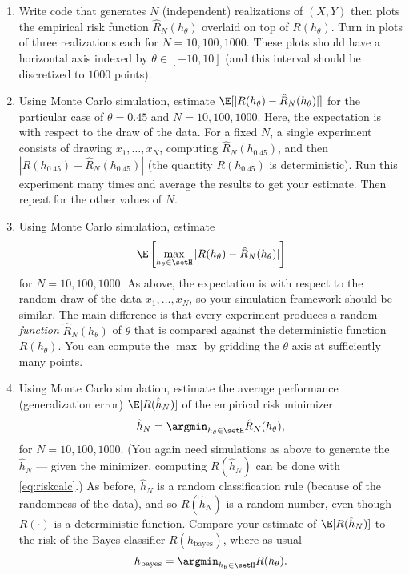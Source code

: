 \documentclass[11pt]{article}
\begin{document}
\begin{enumerate}
\begin{enumerate}
	
	\item   Write code that generates $N$ (independent) realizations of $(X,Y)$ then plots the empirical risk function $\hat{R}_N(h_\theta)$ overlaid on top of $R(h_\theta)$.  Turn in plots of three realizations each for $N=10,100,1000$.  These plots should have a horizontal axis indexed by $\theta\in[-10,10]$ (and this interval should be discretized to $1000$ points).
	
	\item Using Monte Carlo simulation, estimate $\E[|R(h_\theta)-\hat{R}_N(h_\theta)|]$ for the particular case of $\theta = 0.45$ and $N=10,100,1000$.  Here, the expectation is with respect to the draw of the data.  For a fixed $N$, a single experiment consists of drawing $x_1,\ldots,x_N$, computing $\hat{R}_N(h_{0.45})$, and then $|R(h_{0.45})-\hat{R}_N(h_{0.45})|$ (the quantity $R(h_{0.45})$ is deterministic).  Run this experiment many times and average the results to get your estimate.  Then repeat for the other values of $N$.
	
	\item Using Monte Carlo simulation, estimate 
	\[
		\E\left[\max_{h_\theta\in\setH}|R(h_\theta)-\hat{R}_N(h_\theta)|\right]
	\]
	for $N=10,100,1000$.  As above, the expectation is with respect to the random draw of the data $x_1,\ldots,x_N$, so your simulation framework should be similar.  The main difference is that every experiment produces a random {\em function} $\hat{R}_N(h_\theta)$ of $\theta$ that is compared against the deterministic function $R(h_\theta)$.  You can compute the $\max$ by gridding the $\theta$ axis at sufficiently many points.
	
	\item Using Monte Carlo simulation, estimate the average performance (generalization error) $\E[R(\hat{h}_N)]$ of the empirical risk minimizer
	\[
		\hat{h}_N = \argmin_{h_\theta\in\setH} \hat{R}_N(h_\theta),
	\]
	for $N=10,100,1000$.  (You again need simulations as above to generate the $\hat{h}_N$ --- given the minimizer, computing $R(\hat{h}_N)$ can be done with \eqref{eq:riskcalc}.)  As before, $\hat{h}_N$ is a random classification rule (because of the randomness of the data), and so $R(\hat{h}_N)$ is a random number, even though $R(\cdot)$ is a deterministic function.  Compare your estimate of $\E[R(\hat{h}_N)]$ to the risk of the Bayes classifier $R(h_{\mathrm{bayes}})$, where as usual
	\[
		h_{\mathrm{bayes}} = \argmin_{h_\theta\in\setH} R(h_\theta).
	\]
\end{enumerate}



\end{enumerate}
\end{document}
